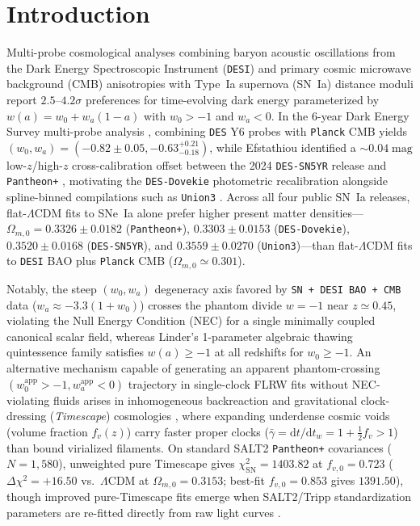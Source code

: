 \documentclass[11pt,a4paper]{article}
\begin{document}
\section{Introduction}
Multi-probe cosmological analyses combining baryon acoustic oscillations from the Dark Energy Spectroscopic Instrument (\texttt{DESI}) \cite{DESI2024VI,DESIDR2_2025} and primary cosmic microwave background (CMB) anisotropies \cite{Planck2018VI} with Type~Ia supernova (SN~Ia) distance moduli report $2.5\text{--}4.2\sigma$ preferences for time-evolving dark energy parameterized by $w(a) = w_0 + w_a(1 - a)$ with $w_0 > -1$ and $w_a < 0$. In the 6-year Dark Energy Survey multi-probe analysis \cite{DES2026DynDE}, combining \texttt{DES} Y6 probes with \texttt{Planck} CMB yields $(w_0, w_a) = (-0.82 \pm 0.05, -0.63^{+0.21}_{-0.18})$, while Efstathiou \cite{Efstathiou2025SN} identified a $\sim 0.04\;\mathrm{mag}$ low-$z$/high-$z$ cross-calibration offset between the 2024 \texttt{DES-SN5YR} release \cite{DESSN5YR2024} and \texttt{Pantheon+} \cite{Brout2022}, motivating the \texttt{DES-Dovekie} photometric recalibration \cite{PopovicDovekie2025} alongside spline-binned compilations such as \texttt{Union3} \cite{RubinUnion3_2025}. Across all four public SN~Ia releases, flat-$\Lambda$CDM fits to SNe~Ia alone prefer higher present matter densities---$\Omega_{m,0} = 0.3326 \pm 0.0182$ (\texttt{Pantheon+}), $0.3303 \pm 0.0153$ (\texttt{DES-Dovekie}), $0.3520 \pm 0.0168$ (\texttt{DES-SN5YR}), and $0.3559 \pm 0.0270$ (\texttt{Union3})---than flat-$\Lambda$CDM fits to \texttt{DESI} BAO plus \texttt{Planck} CMB ($\Omega_{m,0} \simeq 0.301$).

Notably, the steep $(w_0, w_a)$ degeneracy axis favored by \texttt{SN + DESI BAO + CMB} data ($w_a \approx -3.3(1+w_0)$) crosses the phantom divide $w = -1$ near $z \simeq 0.45$, violating the Null Energy Condition (NEC) for a single minimally coupled canonical scalar field, whereas Linder's \cite{Linder2015Thawing} 1-parameter algebraic thawing quintessence family satisfies $w(a) \ge -1$ at all redshifts for $w_0 \ge -1$. An alternative mechanism capable of generating an apparent phantom-crossing $(w_0^{\mathrm{app}} > -1, w_a^{\mathrm{app}} < 0)$ trajectory in single-clock FLRW fits without NEC-violating fluids arises in inhomogeneous backreaction and gravitational clock-dressing (\textit{Timescape}) cosmologies \cite{Wiltshire2009PRD,LaneWiltshire2025MNRAS,SeifertWiltshire2025MNRAS}, where expanding underdense cosmic voids (volume fraction $f_v(z)$) carry faster proper clocks ($\bar{\gamma} = \mathrm{d}t/\mathrm{d}t_w = 1 + \frac{1}{2}f_v > 1$) than bound virialized filaments. On standard SALT2 \texttt{Pantheon+} covariances ($N = 1,580$), unweighted pure Timescape gives $\chi^2_{\mathrm{SN}} = 1403.82$ at $f_{v,0} = 0.723$ ($\Delta\chi^2 = +16.50$ vs.\ $\Lambda$CDM at $\Omega_{m,0} = 0.3153$; best-fit $f_{v,0} = 0.853$ gives $1391.50$), though improved pure-Timescape fits emerge when SALT2/Tripp standardization parameters are re-fitted directly from raw light curves \cite{LaneWiltshire2025MNRAS,SeifertWiltshire2025MNRAS}.
\end{document}
